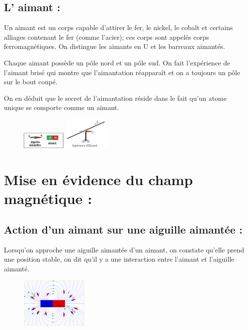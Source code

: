 \documentclass[12pt]{article}
\begin{document}
 
  \subsection{L’ aimant :}
Un aimant est un corps capable d'attirer le fer, le nickel, le cobalt et certains alliages contenant le fer (comme
l'acier); ces corps sont appelés corps ferromagnétiques.
On distingue les aimants en U et les barreaux aimantés.

Chaque aimant possède un pôle nord et un pôle sud.
On fait l’expérience de l’aimant brisé qui montre que l’aimantation réapparaît et on a toujours un pôle sur le
bout coupé.

  On en déduit que le secret de l’aimantation réside dans le fait qu’un atome unique se comporte comme un aimant.

 \begin{figure}
  \vspace{-1cm}
    \includegraphics[width=0.2\textwidth]{./img/Action_aimant_boussole.png}

    \includegraphics[width=0.2\textwidth]{./img/courant_boussole.png}
\end{figure}
 
   \section{Mise en évidence du champ magnétique :}
  \subsection{Action d’un aimant sur une aiguille aimantée :}

  Lorsqu’on approche une aiguille aimantée d’un aimant, on
constate qu’elle prend une position stable, on dit qu’il y a
une interaction entre l’aimant et l’aiguille aimanté.
 
  \begin{figure}
  \vspace{-3cm}
    \includegraphics[width=0.3\textwidth]{./img/miseEnEvidence.jpg}
\end{figure}
\end{document}
